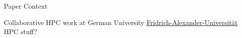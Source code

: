 \begin{frame}{Paper Context}
  \begin{outline}
    \1 Collaborative HPC work at German University
    \1 \href{https://www.fau.eu}{Fridrich-Alexander-Universit{\"a}t}
    \1 HPC stuff? 
  \end{outline}
\end{frame}
